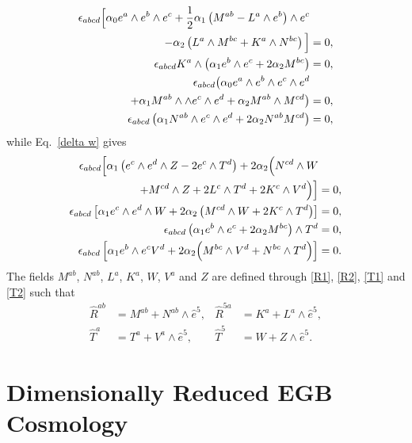 \documentclass[aps,prd,12pt,superscriptaddress,showpacs,showkeys,longbibliography,reprint]{revtex4-1}
\begin{document}
\begin{align}\label{equation}
\epsilon_{abcd}\Big[\alpha_0 e^a\wedge e^b\wedge e^c+\frac{1}{2}\alpha_1\left(M^{ab}-L^a\wedge e^b\right)\wedge e^c&\notag\\
-\alpha_2\left(L^a\wedge M^{bc}+K^a\wedge N^{bc}\right)\Big]&=0,\\
\epsilon_{abcd}K^a\wedge\left(\alpha_1e^b\wedge e^c+2\alpha_2M^{bc}\right)&=0,\\
\epsilon_{abcd}\big(\alpha_0 e^a\wedge e^b\wedge e^c\wedge e^d&\notag\\
+\alpha_1M^{ab}\wedge\wedge e^c\wedge e^d+\alpha_2M^{ab}\wedge M^{cd}\big)&=0,\\
\epsilon_{abcd}\left(\alpha_1N^{ab}\wedge e^c\wedge e^d+2\alpha_2N^{ab}M^{cd}\right)&=0,
\end{align}
while Eq.~\eqref{delta w} gives
\begin{align}
\epsilon_{abcd}\Big[\alpha_1\left(e^c\wedge e^d\wedge Z-2e^c\wedge T^d\right)
+2\alpha_2\Big(N^{cd}\wedge W&\notag\\
+M^{cd}\wedge Z+2L^c\wedge T^d
+2K^c\wedge V^d\Big)\Big]&=0,\\
\epsilon_{abcd}\left[\alpha_1e^c\wedge e^ d\wedge W+2\alpha_2\left(M^{cd}\wedge W+2K^c\wedge T^d\right)\right]&=0,\\
\epsilon_{abcd}\left(\alpha_1e^b\wedge e^c+2\alpha_2M^{bc}\right)\wedge T^d&=0,\\
\epsilon_{abcd}\left[\alpha_1e^b\wedge e^c V^d+2\alpha_2\Big(M^{bc}\wedge V^d+N^{bc}\wedge T^d\Big)\right]&=0.
\end{align}
The fields $M^{ab}$, $N^{ab}$, $L^a$, $K^a$, $W$, $V^a$ and $Z$ are defined through \eqref{R1}, \eqref{R2}, \eqref{T1} and \eqref{T2} such that
\begin{align*}
\hat{R}^{ab}&=M^{ab}+N^{ab}\wedge\hat{e}^5, & \hat{R}^{5a}&=K^a+L^a\wedge\hat{e}^5,\\
\hat{T}^a&=T^a+V^a\wedge\hat{e}^5, & \hat{T}^5&=W+Z\wedge\hat{e}^5.
\end{align*}





\section{Dimensionally Reduced EGB Cosmology}\label{cosmos}
\end{document}
